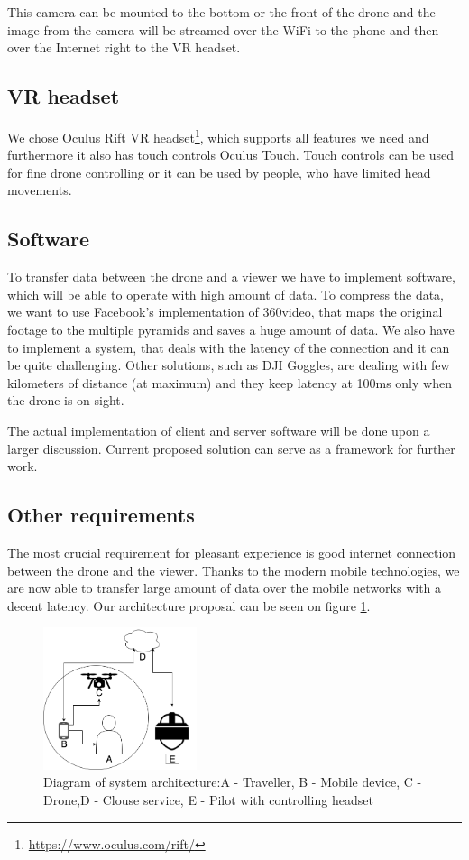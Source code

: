 This camera can be mounted to the bottom or the front of the drone and the image from the camera will be streamed over the WiFi to the phone and then over the Internet right to the VR headset.

\subsection{VR headset}
We chose Oculus Rift VR headset\footnote{\url{https://www.oculus.com/rift/}}, which supports all features we need and furthermore it also has touch controls Oculus Touch. Touch controls can be used for fine drone controlling or it can be used by people, who have limited head movements. 

\subsection{Software}
To transfer data between the drone and a viewer we have to implement software, which will be able to operate with high amount of data. To compress the data, we want to use Facebook's implementation of 360\degree video, that maps the original footage to the multiple pyramids and saves a huge amount of data\cite{facebook2016videoencoding}. We also have to implement a system, that deals with the latency of the connection and it can be quite challenging. Other solutions, such as DJI Goggles, are dealing with few kilometers of distance (at maximum) and they keep latency at 100ms only when the drone is on sight.

The actual implementation of client and server software will be done upon a larger discussion. Current proposed solution can serve as a framework for further work.

\subsection{Other requirements}
The most crucial requirement for pleasant experience is good internet connection between the drone and the viewer. Thanks to the modern mobile technologies, we are now able to transfer large amount of data over the mobile networks with a decent latency. Our architecture proposal can be seen on figure \ref{fig:connection}.

\begin{figure}[h!]
    \centering
    \includegraphics[width=0.40\textwidth]{img/connectiondiagram}
    \caption[]{Diagram of system architecture:\newline A - Traveller, B - Mobile device, C - Drone,\newline D - Clouse service, E - Pilot with controlling headset}
    \label{fig:connection}
\end{figure}

